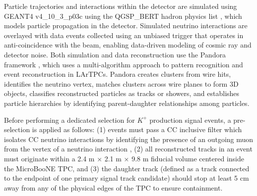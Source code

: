 \documentclass[aps,prd,longbibliography,twocolumn,showpacs,superscriptaddress,floatfix,10pt]{revtex4-1}
\begin{document}
Particle trajectories and interactions within the detector are simulated using GEANT4 v4\_10\_3\_p03c using the QGSP\_BERT hadron physics list \cite{AGOSTINELLI2003250, 1610988, ALLISON2016186}, which models particle propagation in the detector. Simulated neutrino interactions are overlayed with data events collected using an unbiased trigger that operates in anti-coincidence with the beam, enabling data-driven modeling of cosmic ray and detector noise. 
Both simulation and data reconstruction use the Pandora framework \cite{pandora}, which uses a multi-algorithm approach to pattern recognition and event reconstruction in LArTPCs. Pandora creates clusters from wire hits, identifies the neutrino vertex, matches clusters across wire planes to form 3D objects, classifies reconstructed particles as tracks or showers, and establishes particle hierarchies by identifying parent-daughter relationships among particles.
 

Before performing a dedicated selection for $K^{+}$ production signal events, a pre-selection is applied as follows: (1) events must pass a CC inclusive filter which isolates CC neutrino interactions by identifying the presence of an outgoing muon from the vertex of a neutrino interaction \cite{MicroBooNE:2019nio}, (2) all reconstructed tracks in an event must originate within a 2.4 m × 2.1 m × 9.8 m fiducial volume centered inside the MicroBooNE TPC, and (3) the daughter track (defined as a track connected to the endpoint of one primary signal track candidate) should stop at least 5 cm away from any of the physical edges of the TPC to ensure containment. 
\end{document}
